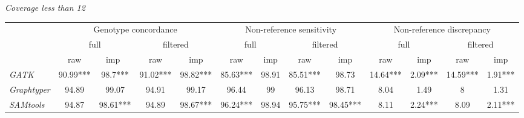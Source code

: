 \documentclass[../main.tex]{subfiles}
\begin{document}
\begin{flushleft}
\begin{landscape}
\bigskip
\bigskip
\bigskip


    
    \centering
    \emph{Coverage less than 12}
    \begin{footnotesize}
    \begin{tabular}{|l|c|c|c|c|c|c|c|c|c|c|c|c|} 
    \cline{2-13}
    \multicolumn{1}{c|}{\multirow{3}{*}{}} & \multicolumn{4}{c|}{Genotype concordance}                 & \multicolumn{4}{c|}{Non-reference sensitivity}            & \multicolumn{4}{c|}{Non-reference discrepancy}             \\ 
    \cline{2-13}
    \multicolumn{1}{c|}{}                  & \multicolumn{2}{c|}{full} & \multicolumn{2}{c|}{filtered} & \multicolumn{2}{c|}{full} & \multicolumn{2}{c|}{filtered} & \multicolumn{2}{c|}{full} & \multicolumn{2}{c|}{filtered}  \\ 
    \cline{2-13}
    \multicolumn{1}{c|}{}                  & raw      & imp~           & raw      & imp                & raw      & imp            & raw      & imp                & raw      & imp            & raw      & imp                 \\ 
    \arrayrulecolor{black}\cline{1-1}\arrayrulecolor{black}\cline{2-13}
    \emph{GATK}                                   & 90.99*** & 98.7***        & 91.02*** & 98.82***           & 85.63*** & 98.91          & 85.51*** & 98.73              & 14.64*** & 2.09***        & 14.59*** & 1.91***             \\ 
    \hline
    \emph{Graphtyper}                             & 94.89    & 99.07          & 94.91    & 99.17              & 96.44    & 99             & 96.13    & 98.71              & 8.04     & 1.49           & 8        & 1.31                \\ 
    \hline
    \emph{SAMtools}                               & 94.87    & 98.61***       & 94.89    & 98.67***           & 96.24*** & 98.94          & 95.75*** & 98.45***           & 8.11     & 2.24***        & 8.09     & 2.11***             \\
    \hline
    \end{tabular}
    \end{footnotesize}


\bigskip
\bigskip


\end{landscape}
\end{flushleft}
\end{document}
